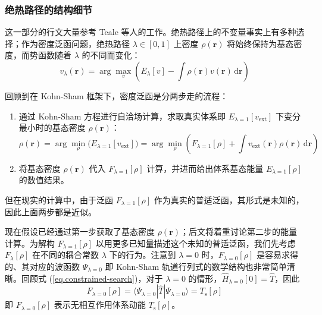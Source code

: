 \subsubsection{绝热路径的结构细节}

这一部分的行文大量参考 Teale 等人的工作\cite{Teale-Helgaker.JCP.2009,Teale-Helgaker.JCP.2010}。绝热路径上的不变量事实上有多种选择；作为密度泛函问题，绝热路径 $\lambda \in [0, 1]$ 上密度 $\rho(\bm{r})$ 将始终保持为基态密度，而势函数随着 $\lambda$ 的不同而变化：
\begin{equation}
  v_\lambda (\bm{r}) = \arg \max_v \left( E_\lambda [v] - \int \rho(\bm{r}) v(\bm{r}) \, \mathrm{d} \bm{r} \right)
\end{equation}

回顾到在 Kohn-Sham 框架下，密度泛函是分两步走的流程：
\begin{enumerate}[nosep]
  \item 通过 Kohn-Sham 方程进行自洽场计算，求取真实体系即 $E_{\lambda=1} [v_\mathrm{ext}]$ 下变分最小时的基态密度 $\rho (\bm{r})$：
  \begin{equation*}
    \rho(\bm{r}) = \arg \min_\rho \big( E_{\lambda=1} [v_\mathrm{ext}] \big) = \arg \min_\rho \left( F_{\lambda = 1} [\rho] + \int v_\mathrm{ext} (\bm{r}) \rho (\bm{r}) \, \mathrm{d} \bm{r} \right)
  \end{equation*}
  \item 将基态密度 $\rho (\bm{r})$ 代入 $F_{\lambda = 1} [\rho]$ 计算，并进而给出体系基态能量 $E_{\lambda=1} [\rho]$ 的数值结果。
\end{enumerate}
但在现实的计算中，由于泛函 $F_{\lambda = 1} [\rho]$ 作为真实的普适泛函，其形式是未知的，因此上面两步都是近似。

现在假设已经通过第一步获取了基态密度 $\rho(\bm{r})$；后文将着重讨论第二步的能量计算。为解构 $F_{\lambda=1} [\rho]$ 以用更多已知量描述这个未知的普适泛函，我们先考虑 $F_{\lambda} [\rho]$ 在不同的耦合常数 $\lambda$ 下的行为。注意到 $\lambda=0$ 时，$F_{\lambda=0} [\rho]$ 是容易求得的、其对应的波函数 $\Psi_{\lambda=0}$ 即 Kohn-Sham 轨道行列式的数学结构也非常简单清晰。回顾式 (\ref{eq.constrained-search})，对于 $\lambda = 0$ 的情形，$\hat H_{\lambda=0} [0] = \hat T$，因此
\begin{equation*}
  F_{\lambda=0} [\rho] = \langle \Psi_{\lambda=0} | \hat T | \Psi_{\lambda=0} \rangle = T_\mathrm{s} [\rho]
\end{equation*}
即 $F_{\lambda=0} [\rho]$ 表示无相互作用体系动能 $T_\mathrm{s} [\rho]$。

